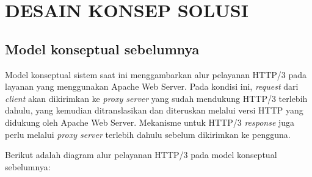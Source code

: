 \chapter{DESAIN KONSEP SOLUSI}
\label{chap:desain-konsep-solusi}
\section{Model konseptual sebelumnya}

Model konseptual sistem saat ini menggambarkan alur pelayanan HTTP/3 pada layanan yang menggunakan Apache Web Server. Pada kondisi ini, \textit{request} dari \textit{client} akan dikirimkan ke \textit{proxy server} yang sudah mendukung HTTP/3 terlebih dahulu, yang kemudian ditranslasikan dan diteruskan melalui versi HTTP yang didukung oleh Apache Web Server. Mekanisme untuk HTTP/3 \textit{response} juga perlu melalui \textit{proxy server} terlebih dahulu sebelum dikirimkan ke pengguna.

Berikut adalah diagram alur pelayanan HTTP/3 pada model konseptual sebelumnya:
